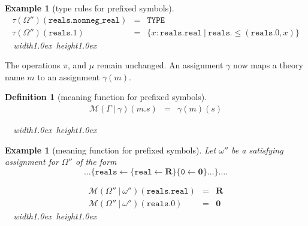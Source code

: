 \documentclass [12pt,twoside]{cslreport}
\newcommand{\thmbox}
   {{\ \hfill\hbox{%
      \vrule width1.0ex height1.0ex
   }\parfillskip 0pt }}
\newtheorem{example}[thm]{Example}
\newcommand{\aro}{\mathord\rightarrow} %
\newcommand{\funtype}[2]{[#1 \aro #2]}
\newcommand{\tupletype}[1]{[#1]}
\newcommand{\Mgamma}[1]{{\mathcal M}(\Gamma\vbar\gamma)(#1)}
\newcommand{\zerob}{\mathbf{0}}
\newcommand{\reals}{\mathbf{R}}
\newcommand{\ttbool}{\mathtt{bool}}
\newcommand{\ttreal}{\mathtt{real}}
\newcommand{\tttype}{\mathtt{TYPE}}
\newcommand{\ttcontext}{\mathtt{CONTEXT}}
\newcommand{\tttheory}{\mathtt{THEORY}}
\newcommand{\vbar}{\ |\ }
\newenvironment{Eg}[1]{\begin{example}[#1]\label{eg:#1}\em }{\thmbox\end{example}}
\newtheorem{definition}{Definition}
\newenvironment{Defn}[1]{\begin{definition}[#1]\label{defn:#1}}{
\thmbox\end{definition}}
\begin{document}
\begin{Eg}{type rules for prefixed symbols}
\begin{eqnarray*}
\tau(\Omega'')(\mathtt{reals.nonneg\_real}) & = & \tttype{}\\
\tau(\Omega'')(\mathtt{reals.1}) & = &
\{ {x} : \mathtt{reals.real} \vbar
\mathtt{reals}.\!\leq( \mathtt{reals.0}, {x})\}
\end{eqnarray*}
\end{Eg}

\begin{comment}
\begin{Eg}{contexts with theory declarations}
\begin{eqnarray*}
\tau(\Omega)(
\begin{array}[t]{l}
\mathtt{reals} : \tttheory{} = (\ttreal{} : \tttype{}, \mathtt{0} : \ttreal{},
\leq : \funtype{\tupletype{\ttreal{},
\ttreal{}}}{\ttbool}), \\
\mathtt{nonneg\_reals}: \tttheory{}  = \\\ \
   ( \mathtt{nonneg\_real} :
\tttype{} = \{ {x} : \mathtt{reals.real} \vbar
\mathtt{reals.\leq}( \mathtt{reals.0}, {x})\},\\\ \  \mathtt{sqrt}: \funtype{
\mathtt{nonneg_real}}{ \mathtt{nonneg_real}}\} )) 
\end{array}
& = & 
\ttcontext
\end{eqnarray*}
%
\end{Eg}
\end{comment}




The operations  $\pi$, and $\mu$ remain unchanged.
  An assignment $\gamma$ now
maps a theory name $m$ to an assignment $\gamma(m)$.
\begin{Defn}{meaning function for prefixed symbols}
\begin{eqnarray*}
  \Mgamma{m.s} & = & \gamma(m)(s)
\end{eqnarray*}
\end{Defn}
\begin{Eg}{meaning function for prefixed symbols}
Let $\omega''$ be a satisfying assignment for $\Omega''$ of the form
$$\ldots \{ \mathtt{reals}\gets \{\ttreal{}\gets
\reals\}\{\mathtt{0}\gets \zerob\}\ldots \} \ldots.$$

\begin{eqnarray*}
\mathcal{M}(\Omega''\vbar\omega'')(\mathtt{reals.real}) & = & \reals\\
\mathcal{M}(\Omega''\vbar\omega'')(\mathtt{reals.0}) & = & \zerob
\end{eqnarray*}
\end{Eg}
\end{document}
